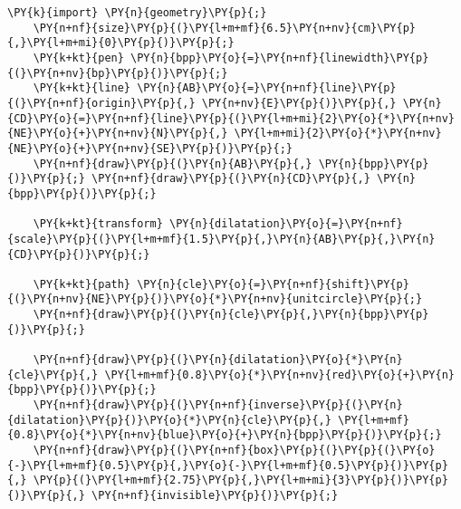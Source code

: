 \begin{Verbatim}[commandchars=\\\{\}]
    \PY{k}{import} \PY{n}{geometry}\PY{p}{;}
    \PY{n+nf}{size}\PY{p}{(}\PY{l+m+mf}{6.5}\PY{n+nv}{cm}\PY{p}{,}\PY{l+m+mi}{0}\PY{p}{)}\PY{p}{;}
    \PY{k+kt}{pen} \PY{n}{bpp}\PY{o}{=}\PY{n+nf}{linewidth}\PY{p}{(}\PY{n+nv}{bp}\PY{p}{)}\PY{p}{;}
    \PY{k+kt}{line} \PY{n}{AB}\PY{o}{=}\PY{n+nf}{line}\PY{p}{(}\PY{n+nf}{origin}\PY{p}{,} \PY{n+nv}{E}\PY{p}{)}\PY{p}{,} \PY{n}{CD}\PY{o}{=}\PY{n+nf}{line}\PY{p}{(}\PY{l+m+mi}{2}\PY{o}{*}\PY{n+nv}{NE}\PY{o}{+}\PY{n+nv}{N}\PY{p}{,} \PY{l+m+mi}{2}\PY{o}{*}\PY{n+nv}{NE}\PY{o}{+}\PY{n+nv}{SE}\PY{p}{)}\PY{p}{;}
    \PY{n+nf}{draw}\PY{p}{(}\PY{n}{AB}\PY{p}{,} \PY{n}{bpp}\PY{p}{)}\PY{p}{;} \PY{n+nf}{draw}\PY{p}{(}\PY{n}{CD}\PY{p}{,} \PY{n}{bpp}\PY{p}{)}\PY{p}{;}

    \PY{k+kt}{transform} \PY{n}{dilatation}\PY{o}{=}\PY{n+nf}{scale}\PY{p}{(}\PY{l+m+mf}{1.5}\PY{p}{,}\PY{n}{AB}\PY{p}{,}\PY{n}{CD}\PY{p}{)}\PY{p}{;}

    \PY{k+kt}{path} \PY{n}{cle}\PY{o}{=}\PY{n+nf}{shift}\PY{p}{(}\PY{n+nv}{NE}\PY{p}{)}\PY{o}{*}\PY{n+nv}{unitcircle}\PY{p}{;}
    \PY{n+nf}{draw}\PY{p}{(}\PY{n}{cle}\PY{p}{,}\PY{n}{bpp}\PY{p}{)}\PY{p}{;}

    \PY{n+nf}{draw}\PY{p}{(}\PY{n}{dilatation}\PY{o}{*}\PY{n}{cle}\PY{p}{,} \PY{l+m+mf}{0.8}\PY{o}{*}\PY{n+nv}{red}\PY{o}{+}\PY{n}{bpp}\PY{p}{)}\PY{p}{;}
    \PY{n+nf}{draw}\PY{p}{(}\PY{n+nf}{inverse}\PY{p}{(}\PY{n}{dilatation}\PY{p}{)}\PY{o}{*}\PY{n}{cle}\PY{p}{,} \PY{l+m+mf}{0.8}\PY{o}{*}\PY{n+nv}{blue}\PY{o}{+}\PY{n}{bpp}\PY{p}{)}\PY{p}{;}
    \PY{n+nf}{draw}\PY{p}{(}\PY{n+nf}{box}\PY{p}{(}\PY{p}{(}\PY{o}{-}\PY{l+m+mf}{0.5}\PY{p}{,}\PY{o}{-}\PY{l+m+mf}{0.5}\PY{p}{)}\PY{p}{,} \PY{p}{(}\PY{l+m+mf}{2.75}\PY{p}{,}\PY{l+m+mi}{3}\PY{p}{)}\PY{p}{)}\PY{p}{,} \PY{n+nf}{invisible}\PY{p}{)}\PY{p}{;}
\end{Verbatim}
